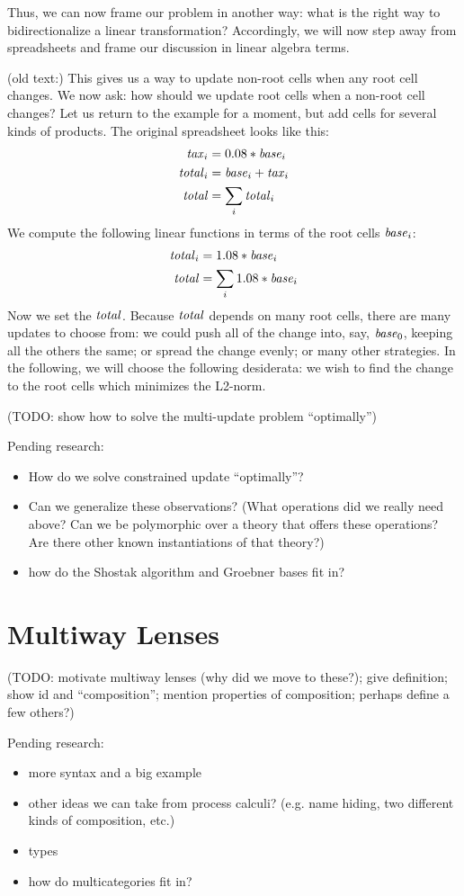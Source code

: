 \documentclass{article}
\begin{document}
Thus, we can now frame our problem in another way: what is the right way to
bidirectionalize a linear transformation? Accordingly, we will now step away
from spreadsheets and frame our discussion in linear algebra terms.

(old text:)
This gives us a way to update non-root cells when any root cell changes. We
now ask: how should we update root cells when a non-root cell changes? Let
us return to the example for a moment, but add cells for several kinds of
products.  The original spreadsheet looks like this:
\begin{align*}
    \mathit{tax}_i &= 0.08*\mathit{base}_i \\
    \mathit{total}_i &= \mathit{base}_i+\mathit{tax}_i \\
    \mathit{total} &= \sum_{i}\mathit{total}_i
\end{align*}
We compute the following linear functions in terms of the root cells
$\mathit{base}_i$:
\begin{align*}
    \mathit{total}_i &= 1.08*\mathit{base}_i \\
    \mathit{total} &= \sum_i 1.08*\mathit{base}_i
\end{align*}
Now we set the $\mathit{total}$. Because $\mathit{total}$ depends on many root cells, there
are many updates to choose from: we could push all of the change into, say,
$\mathit{base}_0$, keeping all the others the same; or spread the change evenly; or
many other strategies. In the following, we will choose the following
desiderata: we wish to find the change to the root cells which minimizes the
L2-norm.

(TODO: show how to solve the multi-update problem ``optimally'')

Pending research:
\begin{itemize}
    \item How do we solve constrained update ``optimally''?
    \item Can we generalize these observations? (What operations did we
        really need above? Can we be polymorphic over a theory that offers
        these operations? Are there other known instantiations of that
        theory?)
    \item how do the Shostak algorithm and Groebner bases fit in?
\end{itemize}
\section{Multiway Lenses}
(TODO: motivate multiway lenses (why did we move to these?); give
definition; show id and ``composition''; mention properties of composition;
perhaps define a few others?)

Pending research:
\begin{itemize}
    \item more syntax and a big example
    \item other ideas we can take from process calculi? (e.g. name hiding,
        two different kinds of composition, etc.)
    \item types
    \item how do multicategories fit in?
\end{itemize}
\end{document}
